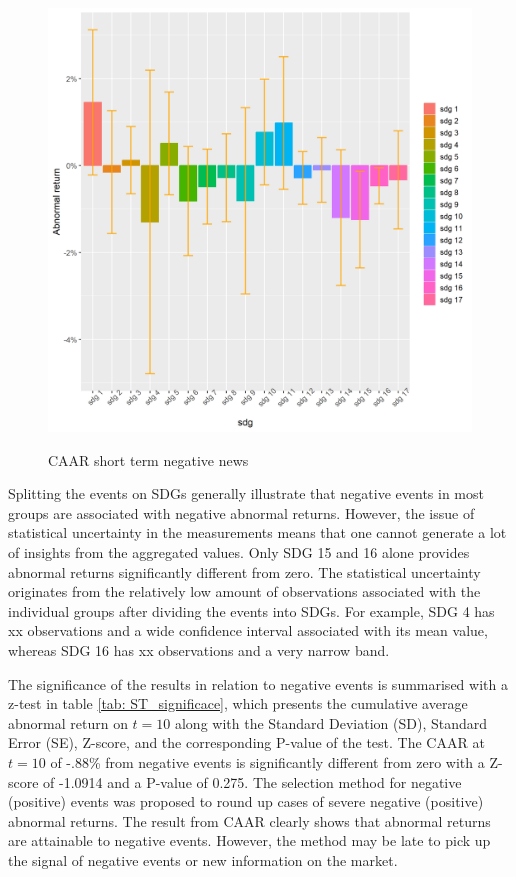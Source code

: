 \begin{figure} [H]
    \centering
    \caption{CAAR short term negative news}
    \includegraphics[scale=0.6]{Projekt/1.Figures analysis/ST_negative_sdg_bar.png}
    \label{fig:ST_neg_bar}
\end{figure}

Splitting the events on SDGs generally illustrate that negative events in most groups are associated with negative abnormal returns. However, the issue of statistical uncertainty in the measurements means that one cannot generate a lot of insights from the aggregated values. Only SDG 15 and 16 alone provides abnormal returns significantly different from zero. The statistical uncertainty originates from the relatively low amount of observations associated with the individual groups after dividing the events into SDGs. For example, SDG 4 has xx observations and a wide confidence interval associated with its mean value, whereas SDG 16 has xx observations and a very narrow band. 


The significance of the results in relation to negative events is summarised with a z-test in table \ref{tab: ST_significace}, which presents the cumulative average abnormal return on $t = 10$ along with the Standard Deviation (SD), Standard Error (SE), Z-score, and the corresponding P-value of the test. The CAAR at $t = 10$ of -.88\% from negative events is significantly different from zero with a Z-score of -1.0914 and a P-value of 0.275. The selection method for negative (positive) events was proposed to round up cases of severe negative (positive) abnormal returns. The result from CAAR clearly shows that abnormal returns are attainable to negative events. However, the method may be late to pick up the signal of negative events or new information on the market. 


